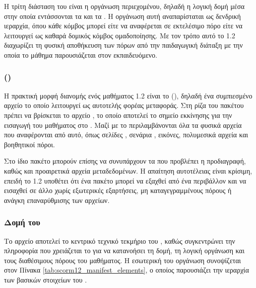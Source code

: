 Η τρίτη διάσταση του  είναι η οργάνωση περιεχομένου, δηλαδή η λογική δομή μέσα στην οποία εντάσσονται τα  και τα . Η οργάνωση αυτή αναπαρίσταται ως δενδρική ιεραρχία, όπου κάθε κόμβος μπορεί είτε να αναφέρεται σε εκτελέσιμο πόρο είτε να λειτουργεί ως καθαρά δομικός κόμβος ομαδοποίησης. Με τον τρόπο αυτό το  1.2 διαχωρίζει τη φυσική αποθήκευση των πόρων από την παιδαγωγική διάταξη με την οποία το μάθημα παρουσιάζεται στον εκπαιδευόμενο.

\subsubsection{   ()}

Η πρακτική μορφή διανομής ενός μαθήματος  1.2 είναι το    (), δηλαδή ένα συμπιεσμένο αρχείο  το οποίο λειτουργεί ως αυτοτελής φορέας μεταφοράς. Στη ρίζα του πακέτου πρέπει να βρίσκεται το αρχείο \texttt{}, το οποίο αποτελεί το σημείο εκκίνησης για την εισαγωγή του μαθήματος στο . Μαζί με το  περιλαμβάνονται όλα τα φυσικά αρχεία που αναφέρονται από αυτό, όπως σελίδες , σενάρια , εικόνες, πολυμεσικά αρχεία και βοηθητικοί πόροι.

Στο ίδιο πακέτο μπορούν επίσης να συνυπάρχουν τα  που προβλέπει η προδιαγραφή, καθώς και προαιρετικά αρχεία μεταδεδομένων. Η απαίτηση αυτοτέλειας είναι κρίσιμη, επειδή το  1.2 υποθέτει ότι ένα πακέτο μπορεί να εξαχθεί από ένα περιβάλλον και να εισαχθεί σε άλλο χωρίς εξωτερικές εξαρτήσεις, μη καταγεγραμμένους πόρους ή ανάγκη επαναρύθμισης των αρχείων.

\subsubsection{Δομή του }

Το αρχείο \texttt{} αποτελεί το κεντρικό τεχνικό τεκμήριο του , καθώς συγκεντρώνει την πληροφορία που χρειάζεται το  για να κατανοήσει τη δομή, τη λογική οργάνωση και τους διαθέσιμους πόρους του μαθήματος. Η εσωτερική του οργάνωση συνοψίζεται στον Πίνακα \ref{tab:scorm12_manifest_elements}, ο οποίος παρουσιάζει την ιεραρχία των βασικών στοιχείων του .




